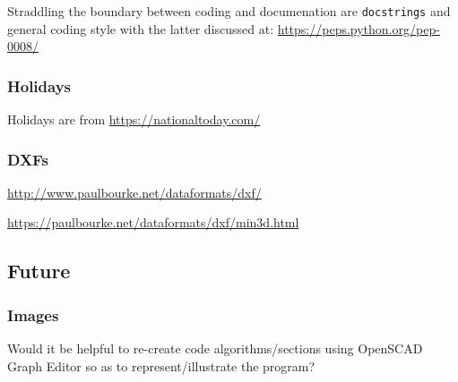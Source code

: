 \documentclass{ltxdoc}
\begin{document}
Straddling the boundary between coding and documenation are \verb|docstrings| and general coding style with the latter discussed at: \url{https://peps.python.org/pep-0008/}


\subsubsection*{Holidays}

Holidays are from \url{https://nationaltoday.com/}

\subsubsection*{DXFs}

\url{http://www.paulbourke.net/dataformats/dxf/}

\noindent\url{https://paulbourke.net/dataformats/dxf/min3d.html}

\subsection*{Future}

\subsubsection*{Images}

Would it be helpful to re-create code algorithms/sections using OpenSCAD Graph Editor so as to represent/illustrate the program?

%

%
%
 
\end{document}
